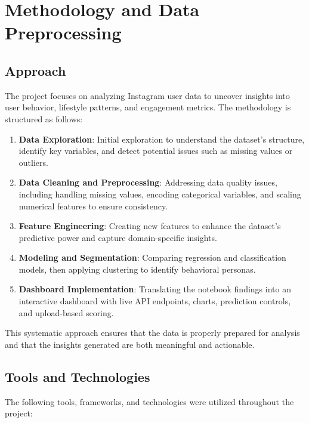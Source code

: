 \documentclass[12pt,a4paper]{article}
\begin{document}
\section{Methodology and Data Preprocessing}

\subsection{Approach}
The project focuses on analyzing Instagram user data to uncover insights into user behavior, lifestyle patterns, and engagement metrics. The methodology is structured as follows:

\begin{enumerate}
    \item \textbf{Data Exploration}: Initial exploration to understand the dataset’s structure, identify key variables, and detect potential issues such as missing values or outliers.
    
    \item \textbf{Data Cleaning and Preprocessing}: Addressing data quality issues, including handling missing values, encoding categorical variables, and scaling numerical features to ensure consistency.
    
    \item \textbf{Feature Engineering}: Creating new features to enhance the dataset’s predictive power and capture domain-specific insights.
    
    \item \textbf{Modeling and Segmentation}: Comparing regression and classification models, then applying clustering to identify behavioral personas.
    
    \item \textbf{Dashboard Implementation}: Translating the notebook findings into an interactive dashboard with live API endpoints, charts, prediction controls, and upload-based scoring.
\end{enumerate}

This systematic approach ensures that the data is properly prepared for analysis and that the insights generated are both meaningful and actionable.
\subsection{Tools and Technologies}
The following tools, frameworks, and technologies were utilized throughout the project:
\end{document}
